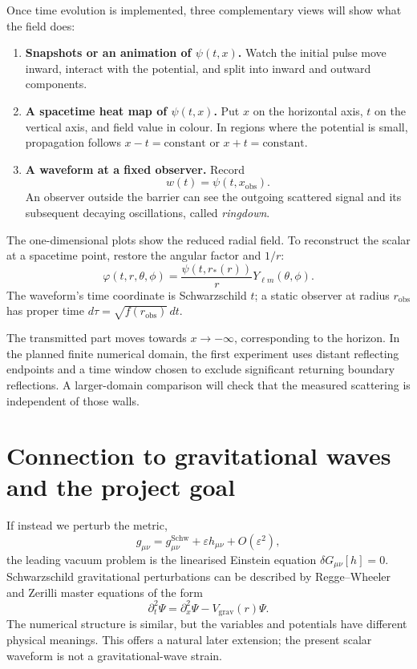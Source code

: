 \documentclass[11pt,a4paper]{article}
\begin{document}
Once time evolution is implemented, three complementary views will show
what the field does:
\begin{enumerate}
 \item \textbf{Snapshots or an animation of \(\psi(t,x)\).}
 Watch the initial pulse move inward, interact with the potential, and
 split into inward and outward components.
 \item \textbf{A spacetime heat map of \(\psi(t,x)\).}
 Put \(x\) on the horizontal axis, \(t\) on the vertical axis, and field
 value in colour. In regions where the potential is small, propagation
 follows \(x-t=\mathrm{constant}\) or \(x+t=\mathrm{constant}\).
 \item \textbf{A waveform at a fixed observer.}
 Record
 \begin{equation}
   w(t)=\psi(t,x_{\mathrm{obs}}).
 \end{equation}
 An observer outside the barrier can see the outgoing scattered signal
 and its subsequent decaying oscillations, called \emph{ringdown}.
\end{enumerate}

The one-dimensional plots show the reduced radial field. To reconstruct
the scalar at a spacetime point, restore the angular factor and \(1/r\):
\begin{equation}
 \varphi(t,r,\theta,\phi)=\frac{\psi(t,r_*(r))}{r}Y_{\ell m}(\theta,\phi).
\end{equation}
The waveform's time coordinate is Schwarzschild \(t\); a static observer
at radius \(r_{\mathrm{obs}}\) has proper time
\(d\tau=\sqrt{f(r_{\mathrm{obs}})}\,dt\).

The transmitted part moves towards \(x\to-\infty\), corresponding to the
horizon. In the planned finite numerical domain, the first experiment
uses distant reflecting endpoints and a time window chosen to exclude
significant returning boundary reflections. A larger-domain comparison
will check that the measured scattering is independent of those walls.

\section{Connection to gravitational waves and the project goal}

If instead we perturb the metric,
\begin{equation}
 g_{\mu\nu}=g^{\mathrm{Schw}}_{\mu\nu}
             +\varepsilon h_{\mu\nu}+O(\varepsilon^2),
\end{equation}
the leading vacuum problem is the linearised Einstein equation
\(\delta G_{\mu\nu}[h]=0\). Schwarzschild gravitational perturbations can
be described by Regge--Wheeler and Zerilli master equations of the form
\begin{equation}
 \partial_t^2\Psi=\partial_x^2\Psi-V_{\mathrm{grav}}(r)\Psi.
\end{equation}
The numerical structure is similar, but the variables and potentials
have different physical meanings. This offers a natural later extension;
the present scalar waveform is not a gravitational-wave strain.
\end{document}
